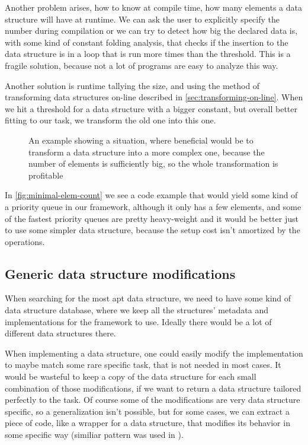 \documentclass[a4paper,11pt]{article}
\begin{document}
		Another problem arises, how to know at compile time, how many elements a data structure will have at
		runtime. We can ask the user to explicitly specify the number during compilation or we can try to
		detect how big the declared data is, with some kind of constant folding analysis, that checks if the
		insertion to the data structure is in a loop that is run more times than the threshold. This is a fragile
		solution, because not a lot of programs are easy to analyze this way.

		Another solution is runtime tallying the size, and using the method of transforming data structures
		on-line described in \autoref{sec:transforming-on-line}. When we hit a threshold for a data structure
		with a bigger constant, but overall better fitting to our task, we transform the old one into this one.

		\begin{figure}
			

			\caption{An example showing a situation, where beneficial would be to transform a data structure
				into a more complex one, because the number of elements is sufficiently big, so the
				whole transformation is profitable}

			\label{fig:minimal-elem-count}
		\end{figure}

        In \autoref{fig:minimal-elem-count} we see a code example that would yield some kind of a priority queue in our
        framework, although it only has a few elements, and some of the fastest priority queues are pretty heavy-weight
        and it would be better just to use some simpler data structure, because the setup cost isn't amortized by the
        operations.

	\subsection{Generic data structure modifications} \label{sub:gdsm}

		When searching for the most apt data structure, we need to have some kind of data structure database,
		where we keep all the structures' metadata and implementations for the framework to use. Ideally there
		would be a lot of different data structures there.

		When implementing a data structure, one could easily modify the implementation to maybe match some rare
		specific task, that is not needed in most cases. It would be wasteful to keep a copy of the data
		structure for each small combination of those modifications, if we want to return a data structure
		tailored perfectly to the task. Of course some of the modifications are very data structure specific, so
		a generalization isn't possible, but for some cases, we can extract a piece of code, like a wrapper for
        a data structure, that modifies its behavior in some specific way (similiar pattern was used in
        \cite{Okasaki}).
\end{document}
